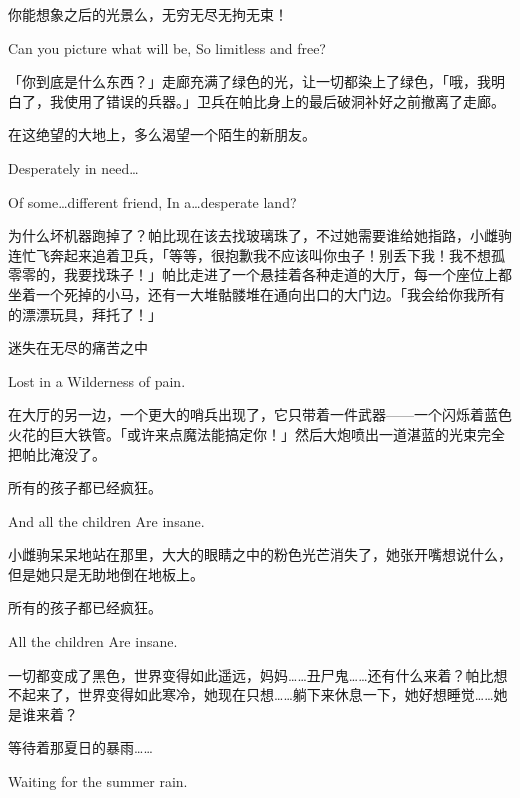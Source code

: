 \begin{song}
    你能想象之后的光景么，无穷无尽无拘无束！
    
    Can you picture what will be, So limitless and free?
\end{song}

「你到底是什么东西？」走廊充满了绿色的光，让一切都染上了绿色，「哦，我明白了，我使用了错误的兵器。」卫兵在帕比身上的最后破洞补好之前撤离了走廊。


\begin{song}
    在这绝望的大地上，多么渴望一个陌生的新朋友。
    
    Desperately in need\dots
    
    Of some\dots different friend, In a\dots desperate land?
\end{song}

为什么坏机器跑掉了？帕比现在该去找玻璃珠了，不过她需要谁给她指路，小雌驹连忙飞奔起来追着卫兵，「等等，很抱歉我不应该叫你虫子！别丢下我！我不想孤零零的，我要找珠子！」帕比走进了一个悬挂着各种走道的大厅，每一个座位上都坐着一个死掉的小马，还有一大堆骷髅堆在通向出口的大门边。「我会给你我所有的漂漂玩具，拜托了！」


\begin{song}
    迷失在无尽的痛苦之中
    
    Lost in a Wilderness of pain.
\end{song}

在大厅的另一边，一个更大的哨兵出现了，它只带着一件武器——一个闪烁着蓝色火花的巨大铁管。「或许来点魔法能搞定你！」然后大炮喷出一道湛蓝的光束完全把帕比淹没了。


\begin{song}
    所有的孩子都已经疯狂。
    
    And all the children Are insane.
\end{song}

小雌驹呆呆地站在那里，大大的眼睛之中的粉色光芒消失了，她张开嘴想说什么，但是她只是无助地倒在地板上。


\begin{song}
    所有的孩子都已经疯狂。
    
    All the children Are insane.
\end{song}

一切都变成了黑色，世界变得如此遥远，妈妈……丑尸鬼……还有什么来着？帕比想不起来了，世界变得如此寒冷，她现在只想……躺下来休息一下，她好想睡觉……她是谁来着？


\begin{song}
    等待着那夏日的暴雨……
    
    Waiting for the summer rain.
\end{song}

